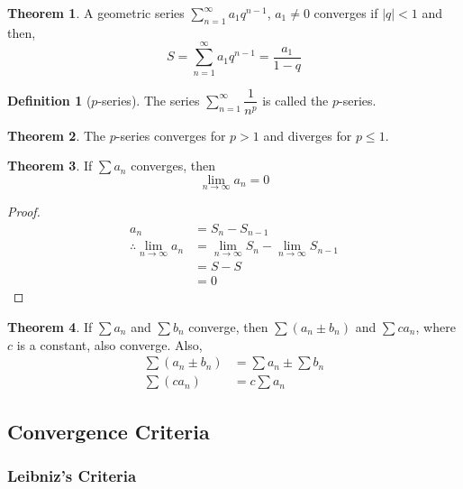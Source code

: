 \documentclass[fleqn, a4paper, 12pt, twoside]{article}
\theoremstyle{definition}
\newtheorem{definition}{Definition}
\theoremstyle{theorem}
\newtheorem{theorem}{Theorem}
\begin{document}
{\begin{theorem}
	A geometric series $\sum\limits_{n = 1}^{\infty} a_1 q^{n - 1}$, $a_1 \neq 0$ converges if $|q| < 1$ and then, 
	\begin{equation*}
		S = \sum_{n = 1}^{\infty} a_1 q^{n - 1} = \dfrac{a_1}{1 - q}
	\end{equation*}
\end{theorem}

\begin{definition}[$p$-series]
	The series $\sum\limits_{n = 1}^{\infty} \dfrac{1}{n^p}$ is called the $p$-series.
\end{definition}

\begin{theorem}
	The $p$-series converges for $p > 1$ and diverges for $p \le 1$.
	\label{convergence and divergence of p-series}
\end{theorem}

\begin{theorem}
	If $\sum a_n$ converges, then
	\begin{equation*}
		\lim\limits_{n \to \infty} a_n = 0
	\end{equation*}
\end{theorem}

\begin{proof}
	\begin{align*}
		a_n &= S_n - S_{n - 1}\\
		\therefore \lim\limits_{n \to \infty} a_n &= \lim\limits_{n \to \infty} S_n - \lim\limits_{n \to \infty} S_{n - 1}\\
		&= S - S\\
		&= 0
	\end{align*}
\end{proof}

\begin{theorem}
	If $\sum a_n$ and $\sum b_n$ converge, then $\sum (a_n \pm b_n)$ and $\sum c a_n$, where $c$ is a constant, also converge. Also,
	\begin{align*}
		\sum (a_n \pm b_n) &= \sum a_n \pm \sum b_n\\
		\sum (c a_n) &= c \sum a_n
	\end{align*}
\end{theorem}

\subsection{Convergence Criteria}

\subsubsection{Leibniz's Criteria}

}
\end{document}
